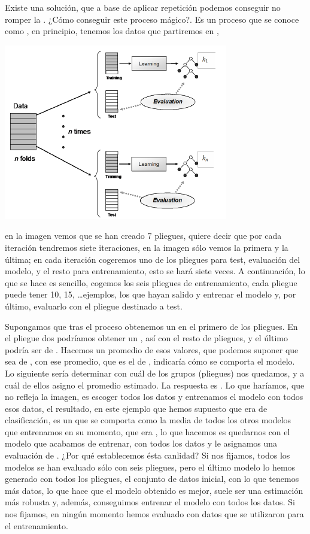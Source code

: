 Existe una solución, que a base de aplicar repetición podemos conseguir no romper la . ¿Cómo conseguir este proceso mágico?. Es un proceso que se conoce como , en principio, tenemos los datos que partiremos en ,
\begin{center}
    \includegraphics[scale=.67]{images/mod02-07.png}
\end{center}
en la imagen vemos que se han creado 7 pliegues, quiere decir que por cada iteración tendremos siete iteraciones, en la imagen sólo vemos la primera y la última; en cada iteración cogeremos uno de los pliegues para test, evaluación del modelo, y el resto para entrenamiento, esto se hará siete veces. A continuación, lo que se hace es sencillo, cogemos los seis pliegues de entrenamiento, cada pliegue puede tener 10, 15, \ldots ejemplos, los que hayan salido y entrenar el modelo y, por último, evaluarlo con el pliegue destinado a test.

Supongamos que tras el proceso obtenemos un  en el primero de los pliegues. En el pliegue dos podríamos obtener un , así con el resto de pliegues, y el último podría ser de . Hacemos un promedio de esos valores, que podemos suponer que sea de , con ese promedio, que es el de , indicaría cómo se comporta el modelo. Lo siguiente sería determinar con cuál de los grupos (pliegues) nos quedamos, y a cuál de ellos asigno el promedio estimado. La respuesta es . Lo que haríamos, que no refleja la imagen, es escoger todos los datos y entrenamos el modelo con todos esos datos, el resultado, en este ejemplo que hemos supuesto que era de clasificación, es un  que se comporta como la media de todos los otros modelos que entrenamos en su momento, que era , lo que hacemos es quedarnos con el modelo que acabamos de entrenar, con todos los datos y le asignamos una evaluación de . ¿Por qué establecemos ésta canlidad? Si nos fijamos, todos los modelos se han evaluado sólo con seis pliegues, pero el último modelo lo hemos generado con todos los pliegues, el conjunto de datos inicial, con lo que tenemos más datos, lo que hace que el modelo obtenido es mejor, suele ser una estimación más robusta y, además, conseguimos entrenar el modelo con todos los datos. Si nos fijamos, en ningún momento hemos evaluado con datos que se utilizaron para el entrenamiento.

